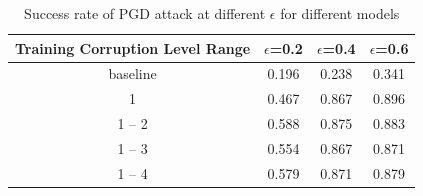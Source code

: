 \documentclass[../main.tex]{subfiles}
\begin{document}
\begin{table}[htbp]
\linespread{1.5} 
\renewcommand\arraystretch{1.25}
\centering
\begin{tabular}{|c|c|c|c|}
    \hline
     Training Corruption Level Range& $\epsilon$=0.2 & $\epsilon$=0.4 & $\epsilon$=0.6  \\
     \hline
     baseline & 0.196& 0.238& 0.341 \\
     \hline
     1 & 0.467& 0.867 &  0.896\\
     \hline
     1 -- 2& 0.588 & 0.875& 0.883  \\
     \hline
     1 -- 3& 0.554 & 0.867 & 0.871   \\
     \hline
     1 -- 4& 0.579 & 0.871& 0.879  \\
     \hline
\end{tabular}
\caption{Success rate of PGD attack at different $\epsilon$ for different models }
\label{tab:corrupted_adv}
\end{table}
\end{document}
